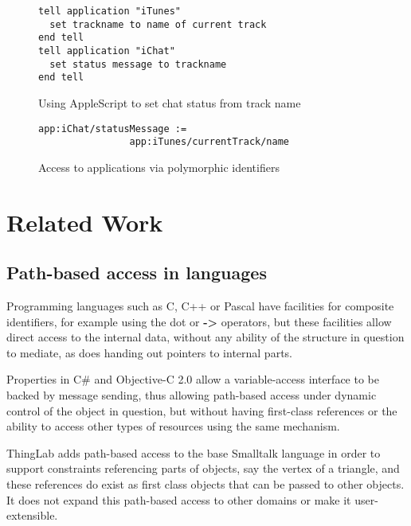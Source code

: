 \documentclass[preprint,authoryear]{acm_proc_article-sp}
\begin{document}
\begin{figure}[htbp]
\begin{center}
\begin{verbatim}
tell application "iTunes"
  set trackname to name of current track
end tell
tell application "iChat"
  set status message to trackname
end tell
\end{verbatim}
\caption{Using AppleScript to set chat status from track name}
\label{AppleScript}
\end{center}
\end{figure}


\begin{figure}[htbp]
\begin{center}
\begin{verbatim}
app:iChat/statusMessage :=
                app:iTunes/currentTrack/name
\end{verbatim}
\caption{Access to applications via polymorphic identifiers}
\label{NonAppleScript}
\end{center}
\end{figure}


\section{Related Work}


\subsection{Path-based access in languages}

Programming languages such as C, C++ or Pascal have facilities for composite
identifiers, for example using the dot or {\bf -> } operators, but these facilities allow
direct access to the internal data, without any ability of the structure in question to 
mediate, as does handing out pointers to internal parts.

Properties in C\# and Objective-C 2.0 allow a variable-access interface to be backed by 
message sending, thus allowing path-based access under dynamic control of the object
in question, but without having first-class references or the ability to access other
types of resources using the same mechanism.

ThingLab\cite{thinglab}  adds path-based access to the base Smalltalk language in order to support
constraints referencing parts of objects, say the vertex of a triangle, and these
references do exist as first class objects that can be passed to other objects.
   It does not
expand this path-based access to other domains or make it user-extensible.
\end{document}
